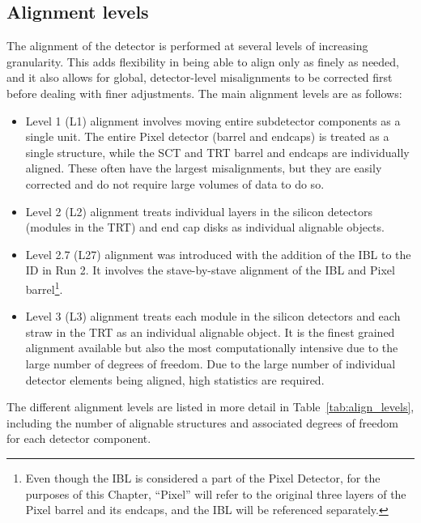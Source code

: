 \subsection{Alignment levels}\label{align:levels}
The alignment of the detector is performed at several levels of increasing granularity.
This adds flexibility in being able to align only as finely as needed, and it also allows for global, detector-level misalignments to be corrected first before dealing with finer adjustments.
The main alignment levels are as follows:
\begin{itemize}%
\item Level 1 (L1) alignment involves moving entire subdetector components as a single unit.  The entire Pixel detector (barrel and endcaps) is treated as a single structure, while the SCT and TRT barrel and endcaps are individually aligned.  These often have the largest misalignments, but they are easily corrected and do not require large volumes of data to do so.
\item Level 2 (L2) alignment treats individual layers in the silicon detectors (modules in the TRT) and end cap disks as individual alignable objects.
\item Level 2.7 (L27) alignment was introduced with the addition of the IBL to the ID in Run 2.  It involves the stave-by-stave alignment of the IBL and Pixel barrel\footnote{Even though the IBL is considered a part of the Pixel Detector, for the purposes of this Chapter, ``Pixel'' will refer to the original three layers of the Pixel barrel and its endcaps, and the IBL will be referenced separately.}.
\item Level 3 (L3) alignment treats each module in the silicon detectors and each straw in the TRT as an individual alignable object.  It is the finest grained alignment available but also the most computationally intensive due to the large number of degrees of freedom.  Due to the large number of individual detector elements being aligned, high statistics are required.
\end{itemize}
The different alignment levels are listed in more detail in Table~\ref{tab:align_levels}, including the number of alignable structures and associated degrees of freedom for each detector component.

